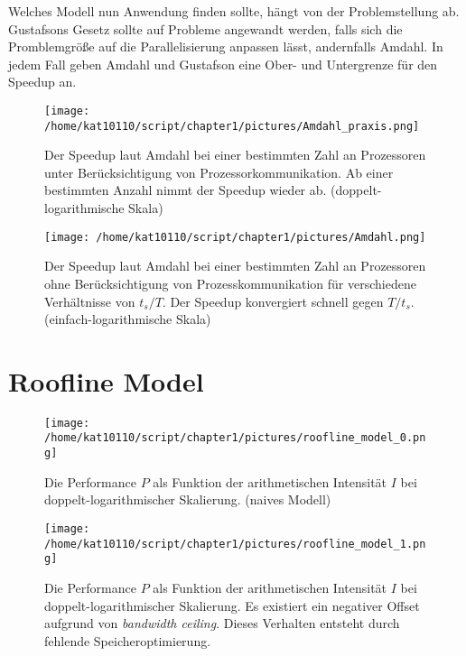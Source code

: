         Welches Modell nun Anwendung finden sollte, hängt von der Problemstellung ab. Gustafsons Gesetz sollte auf Probleme angewandt werden, falls sich die Promblemgrö\ss e auf die Parallelisierung anpassen lässt, andernfalls Amdahl. In jedem Fall geben Amdahl und Gustafson eine Ober- und Untergrenze für den \Gls{Speedup} an. 
        
        \begin{figure}[h]
			\centering
    		\texttt{[image: /home/kat10110/script/chapter1/pictures/Amdahl\_praxis.png]}
    		\caption[Speedup laut Amdahl mit Prozesskommunikation]{Der Speedup laut Amdahl bei einer bestimmten Zahl an Prozessoren unter Berücksichtigung von Prozessorkommunikation. Ab einer bestimmten Anzahl nimmt der Speedup wieder ab. (doppelt-logarithmische Skala) \autocite{carch}}
    		\label{1:am_prax}
		\end{figure}
        
        \newpage
		\begin{figure}[h]
			\centering
    		\texttt{[image: /home/kat10110/script/chapter1/pictures/Amdahl.png]}
    		\caption[Speedup laut Amdahl ohne Prozesskommunikation]{Der Speedup laut Amdahl bei einer bestimmten Zahl an Prozessoren ohne Berücksichtigung von Prozesskommunikation für verschiedene Verhältnisse von $t_s/T$. Der Speedup konvergiert schnell gegen $T/t_s$. (einfach-logarithmische Skala) \autocite{wikiAmdahl}}
    		\label{1:am}
		\end{figure}
		
		\newpage
		\section{Roofline Model}
		\begin{figure}[t]
			\centering
	    	\texttt{[image: /home/kat10110/script/chapter1/pictures/roofline\_model\_0.png]}
    		\caption[Roofline Modell - naiv]{Die Performance $P$ als Funktion der arithmetischen Intensität $I$ bei doppelt-logarithmischer Skalierung. (naives Modell) \autocite{wikiRLM}}
    		\label{1:rl0}
		\end{figure}

		\begin{figure}[t]
			\centering
	    	\texttt{[image: /home/kat10110/script/chapter1/pictures/roofline\_model\_1.png]}
    		\caption[Roofline Modell - \textit{bandwidth ceiling}]{Die Performance $P$ als Funktion der arithmetischen Intensität $I$ bei doppelt-logarithmischer Skalierung. Es existiert ein negativer Offset aufgrund von \textit{bandwidth ceiling}. Dieses Verhalten entsteht durch fehlende Speicheroptimierung. \autocite{wikiRLM}}
    		\label{1:rl1}
		\end{figure}
	
